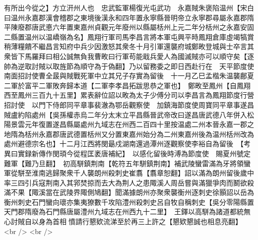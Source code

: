 有所出今從之】方立汧州人也　忠武監軍楊復光屯武功　永嘉賊朱褒陷温州【宋白曰温州永嘉郡漢會稽郡之東境後漢永和四年置永寧縣晉明帝立永寧郡尋屬永嘉郡隋平陳廢郡唐武悳六年置東嘉州貞觀元年廢州以縣屬栝州上元二年分栝州之永嘉安固二縣置温州以温嶠嶺為名】鳳翔行軍司馬李昌言將本軍屯興平時鳳翔倉庫虛竭犒賞稍薄糧饋不繼昌言知府中兵少因激怒其衆冬十月引軍還襲府城鄭畋登城與士卒言其衆皆下馬羅拜曰相公誠無負我曹畋曰行軍苟能戢兵愛人為國滅賊亦可以順守矣【逐帥為逆取討賊以取旌節為順守為于偽翻】乃以留務委之即日西赴行在　天平節度使南面招討使曹全晸與賊戰死軍中立其兄子存實為留後　十一月乙巳孟楷朱温襲鄜夏二軍於富平二軍敗奔歸本道【二軍李孝昌拓跋思恭之軍也】　鄭畋至鳳州【自鳳翔西至鳳州三百九十五里】累表辭位詔以畋為太子少傅分司以李昌言為鳳翔節度行營招討使　以門下侍郎同平章事裴澈為鄂岳觀察使　加鎮海節度使周寶同平章事遂昌賊盧約陷處州【吳孫權赤烏二年分太末立平昌縣晉武帝改曰遂昌唐武德八年併入松陽景雲元年復置遂昌縣屬處州九域志在州西二百四十里按温處二州本晉永嘉一郡之地隋為栝州永嘉郡唐武德置栝州又分置東嘉州始分為二州東嘉州後為温州栝州改為處州避德宗名也】十二月江西將閔朂戍湖南還過潭州逐觀察使李裕自為留後　【考異曰實録新傳作閔頊今從程匡袤唐補紀】　以感化留後時溥為節度使　賜夏州號定難軍【難乃旦翻】　初高駢鎮荆南【乾符五年駢鎮荆南】補武陵蠻雷滿為牙將領蠻軍從駢至淮南逃歸聚衆千人襲朗州殺刺史崔翥【翥章恕翻】詔以滿為朗州留後歲中率三四引兵寇荆南入其郛焚掠而去大為荆人之患陬溪人周岳嘗與滿獵爭肉而鬭欲殺滿不果【陬溪當在武陵界陬側鳩翻】聞滿據朗州亦聚衆襲衡州逐刺史徐顥詔以岳為衡州刺史石門蠻向瓌亦集夷獠數千攻陷澧州殺刺史呂自牧自稱刺史【吳分零陽縣置天門郡隋廢為石門縣唐屬澧州九域志在州西九十二里】　王鐸以高駢為諸道都統無心討賊自以身為首相憤請行懇欵流涕至於再三上許之【懇欵懇誠也相息亮翻】<br />
<br />
